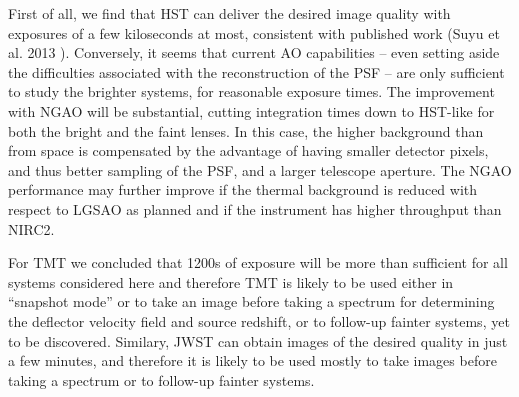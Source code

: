 \documentclass[a4paper,11pt]{article}
\begin{document}
First of all, we find that HST can deliver the desired image quality
with exposures of a few kiloseconds at most, consistent with published work
(Suyu et al. 2013 \cite{2013ApJ...766...70S}). Conversely, it seems
that current AO capabilities -- even setting aside the difficulties
associated with the reconstruction of the PSF -- are only sufficient
to study the brighter systems, for reasonable exposure times. The
improvement with NGAO will be substantial, cutting integration times
down to HST-like for both the bright and the faint lenses. In this
case, the higher background than from space is compensated by the
advantage of having smaller detector pixels, and thus better sampling
of the PSF, and a larger telescope aperture. The NGAO performance may
further improve if the thermal background is reduced with respect to
LGSAO as planned and if the instrument has higher throughput than
NIRC2.

For TMT we concluded that 1200s of exposure will be more than
sufficient for all systems considered here and therefore TMT is likely
to be used either in ``snapshot mode'' or to take an image before taking
a spectrum for determining the deflector velocity field and source
redshift, or to follow-up fainter systems, yet to be
discovered. Similary, JWST can obtain images of the desired quality in
just a few minutes, and therefore it is likely to be used mostly to
take images before taking a spectrum or to follow-up fainter systems.
\end{document}
